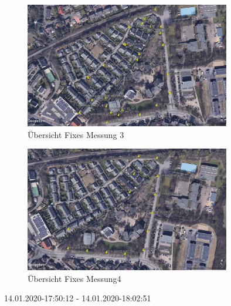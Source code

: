 \begin{figure}[h!]
    \centering
    \includegraphics[width=0.8\textwidth]{Route3}
    \caption{Übersicht Fixes Messung 3}
    \label{fig:map}
\end{figure}

\begin{figure}[h!]
    \centering
    \includegraphics[width=0.8\textwidth]{Route4}
    \caption{Übersicht Fixes Messung4}
    \label{fig:map}
\end{figure}
	



14.01.2020-17:50:12 - 14.01.2020-18:02:51